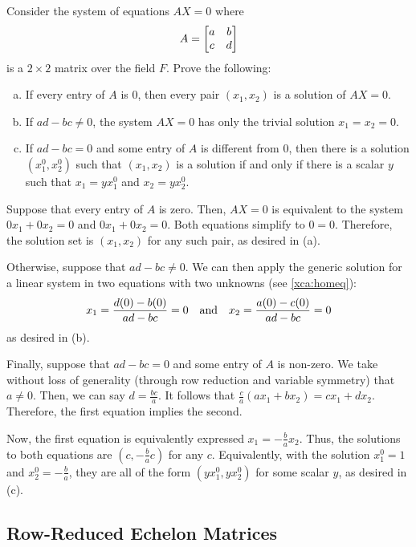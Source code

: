 \documentclass{agony}
\begin{document}
\begin{xca}
  Consider the system of equations $AX = 0$ where \[ A = \mqty[a&b \\ c&d] \]
  is a $2 \times 2$ matrix over the field $F$. Prove the following:
  \setlength\parskip{0pt}
  \begin{enumerate}[(a)]
    \item If every entry of $A$ is 0, then every pair $(x_1, x_2)$ is a solution of $AX = 0$.
    \item If $ad-bc \neq 0$, the system $AX = 0$ has only the trivial solution $x_1 = x_2 = 0$.
    \item If $ad-bc = 0$ and some entry of $A$ is different from 0,
          then there is a solution $(x_1^0, x_2^0)$ such that
          $(x_1, x_2)$ is a solution if and only if there is a scalar $y$ such that
          $x_1 = yx_1^0$ and $x_2 = yx_2^0$.
  \end{enumerate}
\end{xca}
\begin{prf}
  Suppose that every entry of $A$ is zero.
  Then, $AX = 0$ is equivalent to the system $0x_1 + 0x_2 = 0$ and $0x_1 + 0x_2 = 0$.
  Both equations simplify to $0 = 0$.
  Therefore, the solution set is $(x_1, x_2)$ for any such pair, as desired in (a).

  Otherwise, suppose that $ad - bc \neq 0$.
  We can then apply the generic solution for a linear system in two equations with two unknowns
  (see \cref{xca:homeq}):
  \[ x_1 = \frac{d(0) - b(0)}{ad - bc} = 0 \qq{and} x_2 = \frac{a(0) - c(0)}{ad - bc} = 0 \]
  as desired in (b).

  Finally, suppose that $ad - bc = 0$ and some entry of $A$ is non-zero.
  We take without loss of generality (through row reduction and variable symmetry) that $a \neq 0$.
  Then, we can say $d = \frac{bc}{a}$.
  It follows that $\frac{c}{a}(ax_1 + bx_2) = cx_1 + dx_2$.
  Therefore, the first equation implies the second.

  Now, the first equation is equivalently expressed $x_1 = -\frac{b}{a}x_2$.
  Thus, the solutions to both equations are $(c, -\frac{b}{a}c)$ for any $c$.
  Equivalently, with the solution $x_1^0 = 1$ and $x_2^0 = -\frac{b}{a}$,
  they are all of the form $(yx_1^0, yx_2^0)$ for some scalar $y$, as desired in (c).
\end{prf}

\subsection{Row-Reduced Echelon Matrices}
\end{document}
